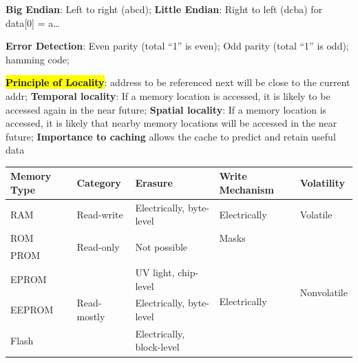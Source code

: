\documentclass[a4paper]{article}
\begin{document}
\begin{multicols*}{2}
  \textbf{Big Endian}: Left to right (abcd); \textbf{Little Endian}: Right to left (dcba) for data[0] = a…

  \textbf{Error Detection}: Even parity (total “1” is even); Odd parity (total “1” is odd); hamming code;

  \hl{\textbf{Principle of Locality}}: address to be referenced next will be close to the current addr; \textbf{Temporal locality}: If a memory location is accessed, it is likely to be accessed again in the near future; \textbf{Spatial locality}: If a memory location is accessed, it is likely that nearby memory locations will be accessed in the near future; \textbf{Importance to caching} allows the cache to predict and retain useful data

  \begin{tabular}{|l|l|l|l|l|}
    \hline
    \textbf{Memory Type} & \textbf{Category}            & \textbf{Erasure}              & \textbf{Write Mechanism}      & \textbf{Volatility}          \\ \hline
    RAM                  & Read-write                   & Electrically, byte-level      & Electrically                  & Volatile                     \\ \hline
    ROM                  & \multirow{2}{*}{Read-only}   & \multirow{2}{*}{Not possible} & Masks                         & \multirow{5}{*}{Nonvolatile} \\ \cline{1-1} \cline{4-4}
    PROM                 &                              &                               & \multirow{4}{*}{Electrically} &                              \\ \cline{1-3}
    EPROM                & \multirow{3}{*}{Read-mostly} & UV light, chip-level          &                               &                              \\ \cline{1-3}
    EEPROM               &                              & Electrically, byte-level      &                               &                              \\ \cline{1-3}
    Flash                &                              & Electrically, block-level     &                               &                              \\ \hline
  \end{tabular}


\end{multicols*}
\end{document}

